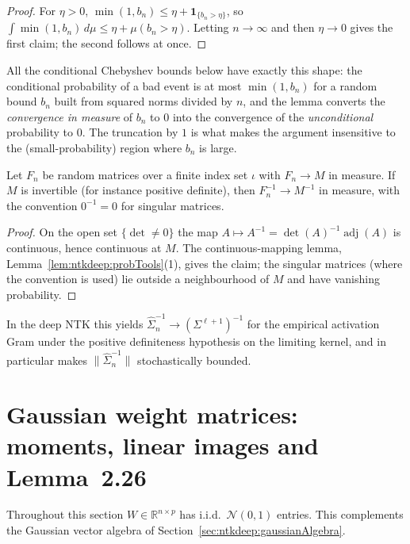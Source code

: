 \begin{proof}
  \leanok
For $\eta>0$, $\min(1,b_n)\le\eta+\mathbf 1_{\{b_n>\eta\}}$, so $\int\min(1,b_n)\,d\mu\le\eta+\mu(b_n>\eta)$. Letting $n\to\infty$ and then $\eta\to0$ gives the first claim; the second follows at once.
\end{proof}

All the conditional Chebyshev bounds below have exactly this shape: the conditional probability of a bad event is at most $\min(1,b_n)$ for a random bound $b_n$ built from squared norms divided by $n$, and the lemma converts the \emph{convergence in measure} of $b_n$ to $0$ into the convergence of the \emph{unconditional} probability to $0$. The truncation by $1$ is what makes the argument insensitive to the (small-probability) region where $b_n$ is large.

\begin{theorem}\label{thm:ntkcond:mconvInverse}
  \leanok
Let $F_n$ be random matrices over a finite index set $\iota$ with $F_n\to M$ in measure. If $M$ is invertible (for instance positive definite), then $F_n^{-1}\to M^{-1}$ in measure, with the convention $0^{-1}=0$ for singular matrices.
\end{theorem}

\begin{proof}
  \leanok
On the open set $\{\det\ne0\}$ the map $A\mapsto A^{-1}=\det(A)^{-1}\operatorname{adj}(A)$ is continuous, hence continuous at $M$. The continuous-mapping lemma, Lemma~\ref{lem:ntkdeep:probTools}(1), gives the claim; the singular matrices (where the convention is used) lie outside a neighbourhood of $M$ and have vanishing probability.
\end{proof}

In the deep NTK this yields $\hat\Sigma_n^{-1}\to(\Sigma^{\ell+1})^{-1}$ for the empirical activation Gram under the positive definiteness hypothesis on the limiting kernel, and in particular makes $\|\hat\Sigma_n^{-1}\|$ stochastically bounded.


\section{Gaussian weight matrices: moments, linear images and Lemma~2.26}\label{sec:ntkcond:gaussianMatrix}

Throughout this section $W\in\mathbb R^{n\times p}$ has i.i.d.\ $\mathcal N(0,1)$ entries. This complements the Gaussian vector algebra of Section~\ref{sec:ntkdeep:gaussianAlgebra}.

